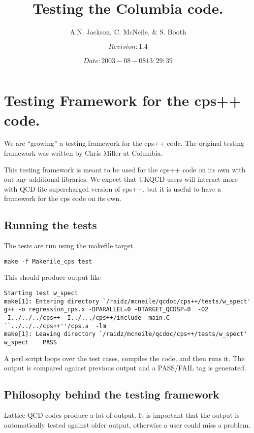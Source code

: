 \documentclass[12pt]{article}
\title{Testing the Columbia code.}
\author{A.N. Jackson, C. McNeile,  \& S. Booth}
\date{\mbox{\small $$Revision: 1.4 $$  $$Date: 2003-08-08 13:29:39 $$}}
\begin{document}
\maketitle

\tableofcontents
\newpage

\section{Testing Framework for the cps++ code.}

We are ``growing'' a testing framework for the cps++ code.
The original testing framework was written by Chris Miller
at Columbia.


This testing framework is meant to be used for the 
cps++ code on its own with out any additional libraries.
We expect that UKQCD users will interact more with 
QCD-lite supercharged version of cps++, but it is useful to 
have a framework for the cps code on its own.

\subsection{Running the tests}

The tests are run using the makefile target.
\begin{verbatim}
make -f Makefile_cps test
\end{verbatim}
This should produce output like
\begin{verbatim}
Starting test w_spect
make[1]: Entering directory `/raidz/mcneile/qcdoc/cps++/tests/w_spect'
g++ -o regression_cps.x -DPARALLEL=0 -DTARGET_QCDSP=0  -O2
-I../../../cps++ -I../.../cps++/include  main.C
``../../../cps++''/cps.a  -lm
make[1]: Leaving directory `/raidz/mcneile/qcdoc/cps++/tests/w_spect'
w_spect    PASS
\end{verbatim}

A perl script loops over the test cases, compiles the code,
and then runs it. The output is compared against
previous output and a PASS/FAIL tag is generated.

\subsection{Philosophy behind the testing framework}

Lattice QCD codes produce a lot of output. It is important that the 
output is automatically tested against older output, otherwise
a user could miss a problem.
\end{document}
